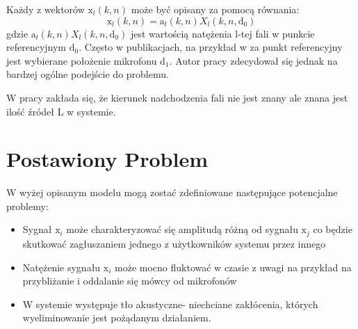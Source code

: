 \noindent Każdy z wektorów $\bm{\mathrm{x}}_l(k,n)$ może być opisany za pomocą równania:
\begin{equation}
    \label{equation:2.3}
    \bm{\mathrm{x}}_l(k,n)=
    \bm{\mathrm{a}}_l(k,n)X_{l}(k,n,\bm{\mathrm{d}}_{0})
\end{equation}
\noindent gdzie $\bm{\mathrm{a}}_l(k,n)X_{l}(k,n,\bm{\mathrm{d}}_{0})$ jest wartością natężenia l-tej fali w punkcie referencyjnym $\bm{\mathrm{d}}_0$. Często w publikacjach, na przykład w \cite{Braun2014} za punkt referencyjny jest wybierane położenie mikrofonu $\bm{\mathrm{d}}_1$. Autor pracy zdecydował się jednak na bardzej ogólne podejście do problemu.

\noindent W pracy zakłada się, że kierunek nadchodzenia fali nie jest znany ale znana jest ilość źródeł L w systemie.


\newpage
\section{Postawiony Problem}

W wyżej opisanym modelu mogą zostać zdefiniowane następujące potencjalne problemy:
\begin{itemize}
    \item Sygnał $\bm{\mathrm{x}}_{i}$ może charakteryzować się amplitudą różną od sygnału $\bm{\mathrm{x}}_{j}$ co będzie skutkować zagłuszaniem jednego z użytkowników systemu przez innego 
    \item Natężenie sygnału $\bm{\mathrm{x}}_{i}$ może mocno fluktować w czasie z uwagi na przykład na przybliżanie i oddalanie się mówcy od mikrofonów
    \item W systemie występuje tło akustyczne- niechciane zakłócenia, których wyeliminowanie jest pożądanym działaniem.
\end{itemize}